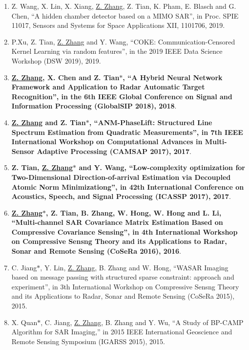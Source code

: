 \documentclass[paper=a4,fontsize=11pt]{scrartcl}
\begin{document}
\begin{enumerate}
\item {Z. Wang, X. Lin, X. Xiang, \underline{Z. Zhang}, Z. Tian, K. Pham, E. Blasch and G. Chen, ``A hidden chamber detector based on a MIMO SAR'', in Proc. SPIE 11017, Sensors and Systems for Space Applications XII, 1101706, 2019}.	
	
\item {P.Xu, Z. Tian, \underline{Z. Zhang} and Y. Wang, ``COKE: Communication-Censored Kernel Learning via random features'', in the 2019 IEEE Data Science Workshop (DSW 2019), 2019}.	
	
\item \textbf{\underline{Z. Zhang}, X. Chen and Z. Tian$\ast$, ``A Hybrid Neural Network Framework and Application to Radar Automatic Target Recognition'', in the 6th IEEE Global Conference on Signal and Information Processing (GlobalSIP 2018), 2018}.

\item \textbf{\underline{Z. Zhang} and Z. Tian$\ast$, ``ANM-PhaseLift: Structured Line Spectrum Estimation from Quadratic Measurements'', in 7th IEEE International Workshop on Computational Advances in Multi-Sensor Adaptive Processing (CAMSAP 2017), 2017}.

\item \textbf{Z. Tian, \underline{Z. Zhang$\ast$} and Y. Wang, ``Low-complexity optimization for Two-Dimensional Direction-of-arrival Estimation via Decoupled Atomic Norm Minimizationg'', in 42th International Conference on Acoustics, Speech, and Signal Processing (ICASSP 2017), 2017}.

\item \textbf{\underline{Z. Zhang$\ast$}, Z. Tian, B. Zhang, W. Hong, W. Hong and L. Li, ``Multi-channel SAR Covariance Matrix Estimation Based on Compressive Covariance Sensing'', in 4th International Workshop on Compressive Sensng Theory and its Applications to Radar, Sonar and Remote Sensing (CoSeRa 2016), 2016}.

\item C. Jiang$\ast$, Y. Lin, \underline{Z. Zhang}, B. Zhang and W. Hong, ``WASAR Imaging based on message passing with structured sparse constraint: approach and experiment'', in 3th International Workshop on Compressive Sensng Theory and its Applications to Radar, Sonar and Remote Sensing (CoSeRa 2015), 2015.

\item X. Quan$\ast$, C. Jiang, \underline{Z. Zhang}, B. Zhang and Y. Wu, ``A Study of BP-CAMP Algorithm for SAR Imaging,'' in 2015 IEEE International Geoscience and Remote Sensing Symposium (IGARSS 2015), 2015.


\end{enumerate}
\end{document}
